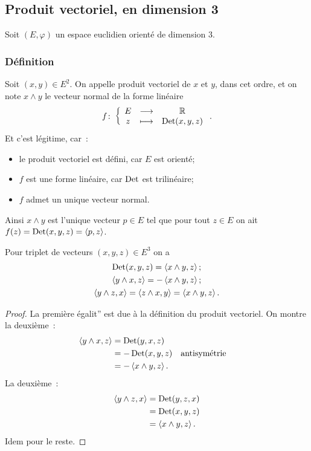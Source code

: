     \subsection{Produit vectoriel, en dimension 3}

    Soit \((E,\varphi)\) un espace euclidien orienté de dimension 3.

    \subsubsection{Définition}

    \begin{defdef}
      Soit \((x,y) \in E^2\). On appelle produit vectoriel de \(x\) et \(y\), dans cet ordre, et on note \(x \wedge y\) le vecteur normal de la forme linéaire
      \begin{equation}
        f\colon \left\{\begin{array}{ccc} E & \longrightarrow &\mathbb{R}\\ z & \longmapsto & \operatorname{Det}(x,y,z) \end{array} \right..
      \end{equation}
      Et c'est légitime, car~:
      \begin{itemize}
        \item le produit vectoriel est défini, car \(E\) est orienté;
        \item \(f\) est une forme linéaire, car \(\operatorname{Det}\) est trilinéaire;
        \item \(f\) admet un unique vecteur normal.
      \end{itemize}
      Ainsi \(x \wedge y\) est l'unique vecteur \(p \in E\) tel que pour tout \(z \in E\) on ait \(f(z)=\operatorname{Det}(x,y,z)=\left\langle{p},{z}\right\rangle\).
    \end{defdef}
    \begin{prop}
      Pour triplet de vecteurs \((x,y,z) \in E^3\) on a
      \begin{gather}
        \operatorname{Det}(x,y,z)=\left\langle{x\wedge y},{z}\right\rangle; \\
        \left\langle{y\wedge x},{z}\right\rangle = -\left\langle{x\wedge y},{z}\right\rangle; \\
        \left\langle{y\wedge z},{x}\right\rangle = \left\langle{z\wedge x},{y}\right\rangle =\left\langle{x\wedge y},{z}\right\rangle.
      \end{gather}
    \end{prop}
    \begin{proof}
      La première égalit'' est due à la définition du produit vectoriel. On montre la deuxième~:
      \begin{align}
        \left\langle{y\wedge x},{z}\right\rangle &=\operatorname{Det}(y,x,z)\\
                                &=-\operatorname{Det}(x,y,z)&& \text{antisymétrie}\\
                                &=-\left\langle{x\wedge y},{z}\right\rangle.
      \end{align}
      La deuxième~:
      \begin{align}
        \left\langle{y\wedge z},{x}\right\rangle &=\operatorname{Det}(y,z,x) \\
                                &=\operatorname{Det}(x,y,z)\\
                                &=\left\langle{x\wedge y},{z}\right\rangle.
      \end{align}
      Idem pour le reste.
    \end{proof}
